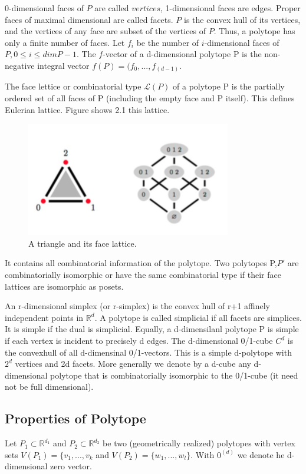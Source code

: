 0-dimensional faces of $P$ are called $vertices$, 1-dimensional faces are edges. Proper faces of maximal dimensional are called facets. $P$ is the convex hull of its vertices, and the vertices of any face are subset of the vertices of $P$. Thus, a polytope has only a finite number of faces. Let $f_i$ be the number of $i$-dimensional faces of $P,0 \leq i \leq dim P-1$. The $f$-vector of a d-dimensional polytope P is the non-negative integral vector $f(P) = (f_0,...,f_(d-1)$.

The face lettice or combinatorial type $\mathcal{L}(P)$ of a polytope P is the partially ordered set of all faces of P (including the empty face and P itself). This defines Eulerian lattice. Figure shows 2.1 this lattice.

\begin{figure}
\centering
\includegraphics{Figures/Eulerian.png}
\decoRule
\caption[]{A triangle and its face lattice.}
\label{Eulerian}
\end{figure}

It contains all combinatorial information of the polytope. Two polytopes P,$P'$ are combinatorially isomorphic or have the same combinatorial type if their face lattices are isomorphic as posets.

An r-dimensional simplex (or r-simplex) is the convex hull of r+1 affinely independent points in $\mathbb{R}^d$. A polytope is called simplicial if all facets are simplices. It is simple if the dual is simplicial. Equally, a d-dimensilanl polytope P is simple if each vertex is incident to precisely d edges. The d-dimensional 0/1-cube $C^d$ is the convexhull of all d-dimensinal 0/1-vectors. This is a simple d-polytope with $2^d$ vertices and 2d facets. More generally we denote by a d-cube any d-dimensional polytope that is combinatorially isomorphic to the 0/1-cube (it need not be full dimensional).

\subsection{Properties of Polytope}
Let $P_1 \subset \mathbb{R}^{d_1}$ and $P_2 \subset \mathbb{R}^{d_2}$ be two (geometrically realized) polytopes with vertex sets $V(P_1)=\{ v_1,...,v_k$ and $V(P_2)=\{ w_1,...,w_l \}$. With $0^{(d)}$ we denote he d-dimensional zero vector.

